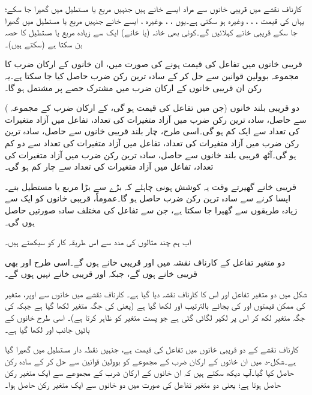 کارناف نقشے میں قریبی خانوں سے مراد ایسے   خانے ہیں جنہیں مربع یا  مستطیل میں گھیرا جا سکے؛  یہاں  کی قیمت  ، ، ، وغیرہ  ہو سکتی ہے۔یوں  ، ، ،وغیرہ  ، ایسے خانے جنہیں مربع یا  مستطیل  میں گھیرا جا سکے  قریبی خانے   کہلائیں  گے۔کوئی بھی خانہ (یا خانے) ایک سے زیادہ مربع یا  مستطیل  کا حصہ بن سکتا ہے (سکتے ہیں)۔

قریبی خانوں میں تفاعل کی قیمت   ہونے کی صورت میں،  ان خانوں کے ارکان ضرب کا مجموعہ   بوولین قوانین سے  حل کر کے   سادہ ترین   رکن ضرب حاصل کیا جا سکتا ہے۔یہ رکن  ان قریبی خانوں کے ارکان ضرب میں مشترک  حصے پر مشتمل ہو گا۔

دو   قریبی بلند  خانوں   (جن میں    تفاعل کی قیمت  ہو  گی، کے ارکان ضرب کے مجموعہ ) سے حاصل،  سادہ ترین      رکن ضرب میں آزاد متغیرات کی تعداد، تفاعل میں آزاد متغیرات کی تعداد سے ایک کم ہو گی۔اسی طرح،  چار بلند  قریبی خانوں سے  حاصل،  سادہ ترین  رکن ضرب میں آزاد متغیرات کی تعداد، تفاعل میں آزاد متغیرات کی تعداد سے دو کم ہو گی۔آٹھ قریبی بلند  خانوں  سے حاصل، سادہ ترین  رکن ضرب میں آزاد متغیرات کی تعداد، تفاعل میں آزاد متغیرات کی تعداد سے چار کم  ہو گی۔
	
قریبی خانے گھیرتے وقت یہ کوشش ہونی چاہئے کہ بڑے سے بڑا مربع یا مستطیل  بنے۔ایسا کرنے سے سادہ ترین  رکن ضرب  حاصل ہو گا۔عموماً،  قریبی خانوں کو  ایک سے زیادہ طریقوں سے گھیرا جا سکتا ہے، جن سے تفاعل کی  مختلف سادہ صورتیں حاصل ہوں گی۔
	
اب ہم چند مثالوں کی مدد سے اس طریقہ کار کو سیکھتے ہیں۔
	

دو متغیر تفاعل کے کارناف نقشہ میں    اور   قریبی خانے ہوں گے۔اسی طرح   اور  بھی  قریبی خانے ہوں گے،  جبکہ   اور   قریبی خانے نہیں ہوں گے۔

شکل     میں دو  متغیر تفاعل اور اس کا کارناف نقشہ دیا گیا ہے۔ کارناف نقشے   میں خانوں  سے اوپر،   متغیر    کی ممکن قیمتوں   اور  کی بجائے بالترتیب  اور  لکھا گیا ہے (یعنی  کی جگہ متغیر لکھا گیا ہے   جبکہ    کی جگہ متغیر لکھ کر اس  پر لکیر لگائی گئی ہے جو پست متغیر کو ظاہر کرتا ہے)۔ اسی طرح خانوں کے بائیں جانب  اور  لکھا گیا ہے۔

 کارناف نقشے  کے  دو قریبی خانوں میں تفاعل کی قیمت   ہے،  جنہیں نقطہ دار  مستطیل میں  گھیرا گیا ہے۔شکل-د  میں ان خانوں کے ارکان ضرب کے مجموعے  کو بوولین قوانین سے حل کر کے  سادہ  رکن حاصل کیا گیا۔آپ دیکھ سکتے ہیں کہ ان  خانوں کے ارکان ضرب کے مجموعے سے ایک متغیر  رکن حاصل ہوتا ہے؛ یعنی دو متغیر تفاعل کی صورت میں  دو خانوں سے ایک متغیر   رکن حاصل ہوا۔

